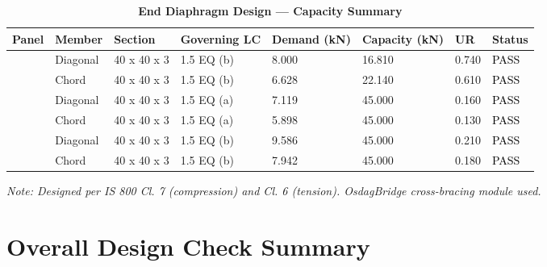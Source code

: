 \documentclass[12pt,a4paper]{report}
\numberwithin{table}{chapter}
\numberwithin{figure}{chapter}
\begin{document}
\begin{longtable}{|C{2.0cm}|L{1.8cm}|C{2.2cm}|C{3.0cm}|C{1.8cm}|C{1.8cm}|C{1.2cm}|C{1.8cm}|}
\caption{\textbf{End Diaphragm Design --- Capacity Summary}}\\
\hline
\textbf{Panel} & \textbf{Member} & \textbf{Section} & \textbf{Governing LC} & \textbf{Demand (kN)} & \textbf{Capacity (kN)} & \textbf{UR} & \textbf{Status} \\[6pt]
\hline
{} & Diagonal & 40 x 40 x 3 & 1.5 EQ (b) & 8.000 & 16.810 & 0.740 & \textcolor{black}{PASS} \\[6pt]
 & Chord & 40 x 40 x 3 & 1.5 EQ (b) & 6.628 & 22.140 & 0.610 & \textcolor{black}{PASS} \\[6pt]
\hline
{} & Diagonal & 40 x 40 x 3 & 1.5 EQ (a) & 7.119 & 45.000 & 0.160 & \textcolor{black}{PASS} \\[6pt]
 & Chord & 40 x 40 x 3 & 1.5 EQ (a) & 5.898 & 45.000 & 0.130 & \textcolor{black}{PASS} \\[6pt]
\hline
{} & Diagonal & 40 x 40 x 3 & 1.5 EQ (b) & 9.586 & 45.000 & 0.210 & \textcolor{black}{PASS} \\[6pt]
 & Chord & 40 x 40 x 3 & 1.5 EQ (b) & 7.942 & 45.000 & 0.180 & \textcolor{black}{PASS} \\[6pt]
\hline
\end{longtable}
\noindent\textit{Note: Designed per IS 800 Cl. 7 (compression) and Cl. 6 (tension). OsdagBridge cross-bracing module used.}

\section{Overall Design Check Summary}
\label{sec:overall-summary}
\end{document}
